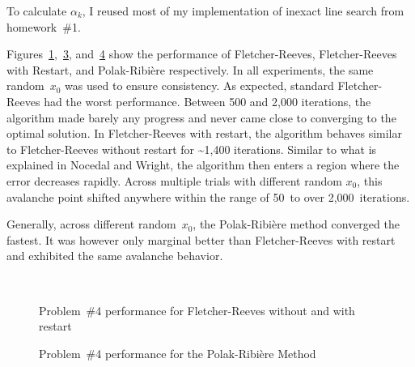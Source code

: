 \noindent
To calculate $\alpha_{k}$, I reused most of my implementation of inexact line search from homework~\#1.

Figures~\ref{fig:p04:FR},~\ref{fig:p04:FRwithRestart}, and~\ref{fig:p04:PR} show the performance of Fletcher-Reeves, Fletcher-Reeves with Restart, and Polak-Ribi\`{e}re respectively. In all experiments, the same random~$x_0$ was used to ensure consistency.  As expected, standard Fletcher-Reeves had the worst performance. Between 500 and 2,000 iterations, the algorithm made barely any progress and never came close to converging to the optimal solution.  In Fletcher-Reeves with restart, the algorithm behaves similar to Fletcher-Reeves without restart for \textasciitilde1,400 iterations.  Similar to what is explained in Nocedal and Wright, the algorithm then enters a region where the error decreases rapidly.  Across multiple trials with different random $x_0$, this avalanche point shifted anywhere within the range of 50~to over 2,000~iterations.

Generally, across different random~$x_0$, the Polak-Ribi\`{e}re method converged the fastest.  It was however only marginal better than Fletcher-Reeves with restart and exhibited the same avalanche behavior.

\begin{figure}[p]
  \centering
  \begin{subfigure}[t]{0.48\textwidth}
    \centering
    
    \caption{}\label{fig:p04:FR}
  \end{subfigure}
  ~
  \begin{subfigure}[t]{0.48\textwidth}
    \centering
    
    \caption{}\label{fig:p04:FRwithRestart}
  \end{subfigure}
  \caption{Problem~\#4 performance for Fletcher-Reeves without and with restart}
\end{figure}

\begin{figure}[p]
  \centering
  
  \caption{Problem~\#4 performance for the Polak-Ribi\`{e}re Method}\label{fig:p04:PR}
\end{figure}
